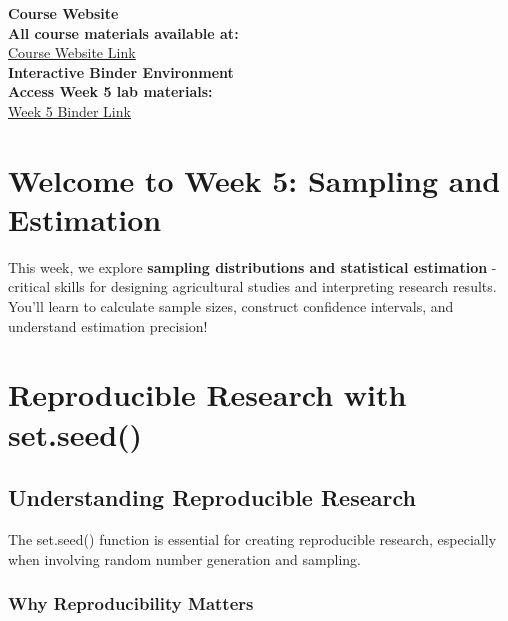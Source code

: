 \documentclass[11pt,a4paper]{article}
\begin{document}
\begin{tcolorbox}[colback=accentgreen!20, colframe=primarygreen, boxrule=2pt, arc=5pt, title={\textbf{\Large Essential Course Resources}}]
\centering
\textbf{\Large Course Website}\\[0.5cm]
\textcolor{primarygreen}{\textbf{All course materials available at:}}\\[0.3cm]
\href{https://mohammadrezanarimaniucdavis.github.io/PLS120-Statistics-Lab-Materials/}{\textcolor{primarygreen}{\underline{Course Website Link}}}\\[0.8cm]

\textbf{\Large Interactive Binder Environment}\\[0.5cm]
\textcolor{primarygreen}{\textbf{Access Week 5 lab materials:}}\\[0.3cm]
\href{https://mybinder.org/v2/gh/MohammadrezaNarimaniUCDavis/PLS120-Statistics-Lab-Materials/binder-week5}{\textcolor{primarygreen}{\underline{Week 5 Binder Link}}}
\end{tcolorbox}

\section{Welcome to Week 5: Sampling and Estimation}

This week, we explore \textbf{sampling distributions and statistical estimation} - critical skills for designing agricultural studies and interpreting research results. You'll learn to calculate sample sizes, construct confidence intervals, and understand estimation precision!

\section{Reproducible Research with set.seed()}

\subsection{Understanding Reproducible Research}

The set.seed() function is essential for creating reproducible research, especially when involving random number generation and sampling.

\subsubsection{Why Reproducibility Matters}
\end{document}
